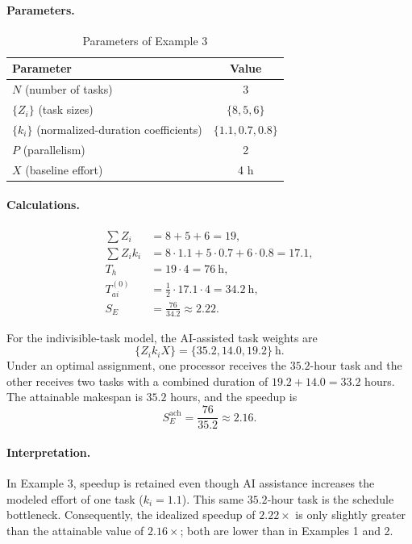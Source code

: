 
\paragraph{Parameters.}
\begin{table}[ht!]
\centering
\caption{Parameters of Example 3}
\label{tab:example-3-params}
\begin{tabular}{lc}
\toprule
Parameter & Value \\
\midrule
$N$ (number of tasks) & 3 \\
$\{Z_i\}$ (task sizes) & $\{8, 5, 6\}$ \\
$\{k_i\}$ (normalized-duration coefficients) & $\{1.1, 0.7, 0.8\}$ \\
$P$ (parallelism) & 2 \\
$X$ (baseline effort) & 4 h \\
\bottomrule
\end{tabular}
\end{table}

\paragraph{Calculations.}
\begin{align*}
  \sum Z_i &= 8 + 5 + 6 = 19, \\
  \sum Z_i k_i &= 8{\cdot}1.1 + 5{\cdot}0.7 + 6{\cdot}0.8 = 17.1, \\
  T_h &= 19 \cdot 4 = 76~\text{h}, \\
  T_{ai}^{(0)} &= \frac{1}{2} \cdot 17.1 \cdot 4 = 34.2~\text{h}, \\
  S_E &= \frac{76}{34.2} \approx 2.22.
\end{align*}

For the indivisible-task model, the AI-assisted task weights are
\[
  \{Z_i k_i X\} = \{35.2, 14.0, 19.2\}~\text{h}.
\]
Under an optimal assignment, one processor receives the $35.2$-hour task and
the other receives two tasks with a combined duration of
$19.2 + 14.0 = 33.2$ hours. The attainable makespan is $35.2$ hours, and the
speedup is
\[
  S_E^{\text{ach}} = \frac{76}{35.2} \approx 2.16.
\]

\paragraph{Interpretation.}
In Example 3, speedup is retained even though AI assistance increases the
modeled effort of one task ($k_i = 1.1$). This same $35.2$-hour task is the
schedule bottleneck. Consequently, the idealized speedup of $2.22\times$ is
only slightly greater than the attainable value of $2.16\times$; both are
lower than in Examples 1 and 2.


